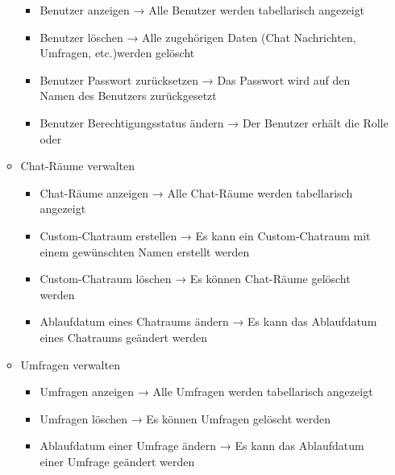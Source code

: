 \begin{itemize}
\begin{itemize}
      \begin{itemize}
        \item Benutzer anzeigen
        \newline
        → Alle Benutzer werden tabellarisch angezeigt
        \item Benutzer löschen
        \newline
        → Alle zugehörigen Daten (Chat Nachrichten, Umfragen, etc.)werden gelöscht
        \item Benutzer Passwort zurücksetzen
        \newline
        → Das Passwort wird auf den Namen des Benutzers zurückgesetzt
        \item Benutzer Berechtigungsstatus ändern
        \newline
        → Der Benutzer erhält die Rolle  oder 
      \end{itemize}
    \item Chat-Räume verwalten
      \begin{itemize}
        \item Chat-Räume anzeigen
        \newline
        → Alle Chat-Räume werden tabellarisch angezeigt
        \item Custom-Chatraum erstellen
        \newline
        → Es kann ein Custom-Chatraum mit einem gewünschten Namen erstellt werden
        \item Custom-Chatraum löschen
        \newline
        → Es können Chat-Räume gelöscht werden
        \item Ablaufdatum eines Chatraums ändern
        \newline
        → Es kann das Ablaufdatum eines Chatraums geändert werden
      \end{itemize}
    \item Umfragen verwalten
      \begin{itemize}
        \item Umfragen anzeigen
        \newline
        → Alle Umfragen werden tabellarisch angezeigt
        \item Umfragen löschen
        \newline
        → Es können Umfragen gelöscht werden
        \item Ablaufdatum einer Umfrage ändern
        \newline
        → Es kann das Ablaufdatum einer Umfrage geändert werden

\end{itemize}
\end{itemize}
\end{itemize}
